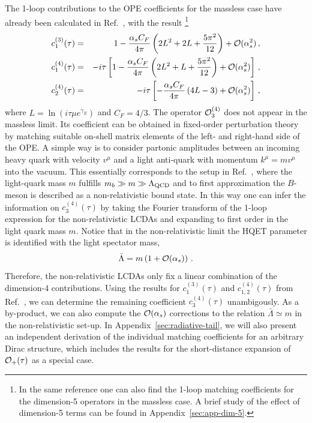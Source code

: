 \documentclass[a4paper,11pt]{article}
\begin{document}
The 1-loop contributions to the OPE coefficients for the massless case have already been calculated
in Ref.~\cite{Kawamura:2008vq}, with the result%
\footnote{In the same reference one can also find the 1-loop matching coefficients for the dimension-5 operators in the massless case.
A brief study of the effect of dimension-5 terms can be found in Appendix~\ref{sec:app-dim-5}.}
\begin{eqnarray}
	c_1^{(3)}(\tau) &=& 1 -\frac{\alpha_s C_F}{4\pi} 
	\left( 2 L^2+2 L + \frac{5\pi^2}{12}\right) + {\cal O}(\alpha_s^2) \,, \cr 
	c_1^{(4)}(\tau) &=& -i\tau \left[ 1 - \frac{\alpha_s C_F}{4\pi} \left( 2 L^2+L + \frac{5\pi^2}{12} \right)  + {\cal O}(\alpha_s^2) \right]  \,, \cr 
	c_{2}^{(4)}(\tau) &=& -i\tau \left[ - \frac{\alpha_s C_F}{4\pi} \left( 4L-3 \right) + {\cal O}(\alpha_s^2)\right]  \,,
\end{eqnarray} 
where $L= \ln \left( i\tau \mu e^{\gamma_E} \right)$ and $C_F=4/3$.
The operator ${\cal O}_3^{(4)}$ does not appear in the massless limit.
% 
Its coefficient can be obtained in fixed-order perturbation theory by matching suitable
on-shell matrix elements of the left- and right-hand side of the OPE. 
%
A simple way is to consider partonic amplitudes between an incoming heavy quark with velocity $v^\mu$ and a light anti-quark with momentum $k^\mu=m v^\mu$ into the vacuum. 
This essentially corresponds to the setup in Ref.~\cite{Bell:2008er}, where the light-quark mass $m$ fulfills $m_b \gg m \gg \Lambda_{\rm QCD}$ and to first approximation the $B$-meson is described as a non-relativistic bound state. In this way one can infer the information on $c_3^{(4)}(\tau)$ by taking the Fourier transform of the 1-loop expression for the non-relativistic LCDAs and expanding to first order in the light quark mass $m$. Notice that in the non-relativistic limit the HQET parameter is identified with the light spectator mass, $$\bar\Lambda = m \left( 1 + {\cal O}(\alpha_s) \right) \,. $$
Therefore, the non-relativistic LCDAs only fix a linear combination of the dimension-4 contributions. Using the results for $c_1^{(3)}(\tau)$ and $c_{1,2}^{(4)}(\tau)$ from Ref.~\cite{Kawamura:2008vq}, we can determine the remaining coefficient $c_3^{(4)}(\tau)$ unambigously. As a by-product, we can also compute the ${\cal O}(\alpha_s)$ corrections to the relation $\bar\Lambda\simeq m$ in the non-relativistic set-up. In Appendix~\ref{sec:radiative-tail}, we will also present an independent derivation of the individual matching coefficients for an arbitrary Dirac structure, which includes the results for the short-distance expansion of ${\cal O}_+(\tau)$ as a special case.
\end{document}
